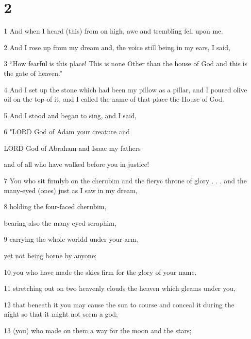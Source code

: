 \chapter{2}

\par 1 And when I heard (this) from on high, awe and trembling fell upon me. 

\par 2 And I rose up from my dream and, the voice still being in my ears, I said,

\par 3 “How fearful is this place! This is none Other than the house of God and this is the gate of heaven.” 

\par 4 And I set up the stone which had been my pillow as a pillar, and I poured olive oil on the top of it, and I called the name of that place the House of God. 

\par 5 And I stood and began to sing, and I said, 

\par 6 "LORD God of Adam your creature and
\par LORD God of Abraham and Isaac my fathers
\par and of all who have walked before you in justice!

\par 7 You who sit firmlyb on the cherubim and the fieryc throne of glory
. . . and the many-eyed (ones) just as I saw in my dream,


\par 8 holding the four-faced cherubim,
\par bearing also the many-eyed seraphim,

\par 9 carrying the whole worldd under your arm,
\par yet not being borne by anyone;

\par 10 you who have made the skies firm for the glory of your name,

\par 11 stretching out on two heavenly clouds the heaven which gleams under you,

\par 12 that beneath it you may cause the sun to course and conceal it during the night so that it might not seem a god;

\par 13 (you) who made on them a way for the moon and the stars;

